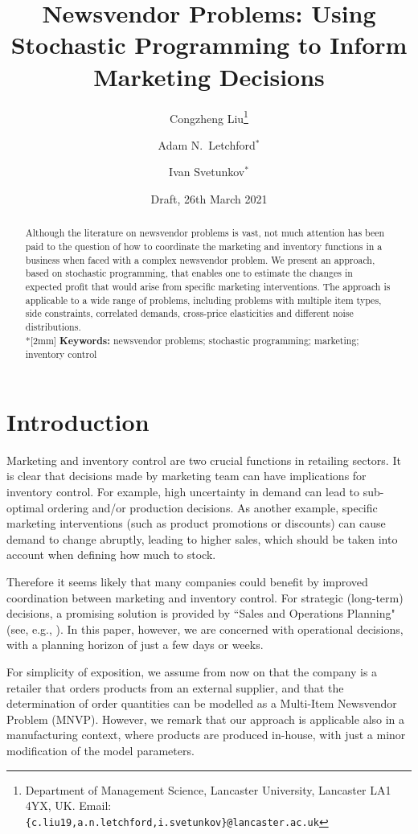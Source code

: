 \documentclass[a4paper,11pt]{article}
\title{Newsvendor Problems: Using Stochastic Programming to Inform Marketing Decisions}
\author{Congzheng Liu\thanks{Department of Management Science,
Lancaster University, Lancaster LA1 4YX, UK.
Email: {\tt \{c.liu19,a.n.letchford,i.svetunkov\}@lancaster.ac.uk}}
\and Adam N.\ Letchford$^*$ \and Ivan Svetunkov$^*$} %
\date{Draft, 26th March 2021}
\begin{document}
\maketitle

\begin{abstract}
Although the literature on newsvendor problems is vast, not much attention has been paid to the question of how to coordinate the marketing and inventory functions in a business when faced with a complex newsvendor problem. We present an approach, based on stochastic programming, that enables one to estimate the changes in expected profit that would arise from specific marketing interventions. The approach is applicable to a wide range of problems, including problems with multiple item types, side constraints, correlated demands, cross-price elasticities and different noise distributions.
\\*[2mm]
{\bf Keywords:} newsvendor problems; stochastic programming; marketing; inventory control 
\end{abstract}

\section{Introduction}

Marketing and inventory control are two crucial functions in retailing sectors. It is clear that decisions made by marketing team can have implications for inventory control. For example, high uncertainty in demand can lead to sub-optimal ordering and/or production decisions. As another example, specific marketing interventions (such as product promotions or discounts) can cause demand to change abruptly, leading to higher sales, which should be taken into account when defining how much to stock.

Therefore it seems likely that many companies could benefit by improved coordination between marketing and inventory control. For strategic (long-term) decisions, a promising solution is provided by ``Sales and Operations Planning" (see, e.g., \cite{KS14,Th12}). In this paper, however, we are concerned with operational decisions, with a planning horizon of just a few days or weeks.

For simplicity of exposition, we assume from now on that the company is a retailer that orders products from an external supplier, and that the determination of order quantities can be modelled as a Multi-Item Newsvendor Problem (MNVP). However, we remark that our approach is applicable also in a manufacturing context, where products are produced in-house, with just a minor modification of the model parameters.
\end{document}
